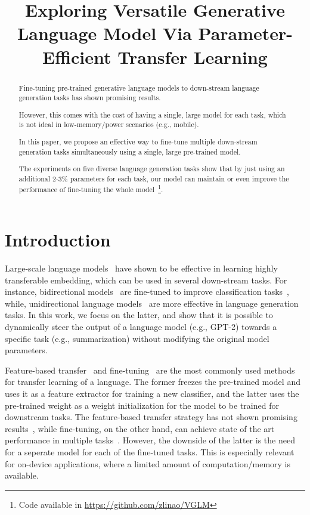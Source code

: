 \title{Exploring Versatile Generative Language Model Via Parameter-Efficient Transfer Learning}

\begin{abstract}
Fine-tuning pre-trained generative language models to down-stream language generation tasks has shown promising results.

However, this comes with the cost of having a single, large model for each task, which is not ideal in low-memory/power scenarios (e.g., mobile).

In this paper, we propose an effective way to fine-tune multiple down-stream generation tasks simultaneously using a single, large pre-trained model. 

The experiments on five diverse language generation tasks show that by just using an additional 2-3\% parameters for each task, our model can maintain or even improve the performance of fine-tuning the whole model~\footnote{Code available in \url{https://github.com/zlinao/VGLM}}.
\end{abstract}

\section{Introduction}
Large-scale language models~\cite{radford2019language,dai-etal-2019-transformer} have shown to be effective in learning highly transferable embedding, which can be used in several down-stream tasks. For instance, bidirectional models~\cite{peters2018deep, devlin2019bert} are fine-tuned to improve classification tasks~\cite{wang2018glue}, while, unidirectional language models~\cite{radford2019language} are more effective in language generation tasks. In this work, we focus on the latter, and show that it is possible to dynamically steer the output of a language model (e.g., GPT-2) towards a specific task (e.g., summarization) without modifying the original model parameters.

Feature-based transfer~\cite{howard2018universal} and fine-tuning~\cite{devlin2019bert} are the most commonly used methods for transfer learning of a language. The former freezes the pre-trained model and uses it as a feature extractor for training a new classifier, and the latter uses the pre-trained weight as a weight initialization for the model to be trained for downstream tasks. The feature-based transfer strategy has not shown promising results~\cite{devlin2019bert}, while fine-tuning, on the other hand, can achieve state of the art performance in multiple tasks~\cite{dong2019unified}. However, the downside of the latter is the need for a seperate model for each of the fine-tuned tasks. This is especially relevant for on-device applications, where a limited amount of computation/memory is available. 

